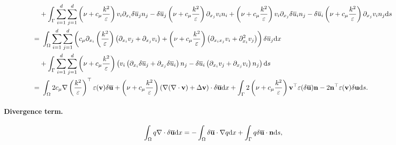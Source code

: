 \documentclass[oneside,11pt]{book}
\numberwithin{equation}{section}
\begin{document}
\begin{align*}
    &+ \int_\Gamma \sum_{i=1}^d\sum_{j=1}^d \left(\nu + c_\mu\frac{k^2}{\varepsilon}\right)v_i\partial_{x_i}\delta\overline{u}_jn_j - \delta\overline{u}_j\left(\nu + c_\mu\frac{k^2}{\varepsilon}\right)\partial_{x_j}v_in_i + \left(\nu + c_\mu\frac{k^2}{\varepsilon}\right)v_i\partial_{x_j}\delta\overline{u}_in_j - \delta\overline{u}_i\left(\nu + c_\mu\frac{k^2}{\varepsilon}\right)\partial_{x_j}v_in_j{\rm d}s\\
    =&\ \int_\Omega \sum_{i=1}^d\sum_{j=1}^d \left(c_\mu\partial_{x_i}\left(\frac{k^2}{\varepsilon}\right)\left(\partial_{x_i}v_j + \partial_{x_j}v_i\right) + \left(\nu + c_\mu\frac{k^2}{\varepsilon}\right)\left(\partial_{x_ix_j}v_i + \partial_{x_i}^2v_j\right)\right)\delta\overline{u}_j{\rm d}x\\
    &+ \int_\Gamma \sum_{i=1}^d\sum_{j=1}^d \left(\nu + c_\mu\frac{k^2}{\varepsilon}\right)\left(v_i\left(\partial_{x_i}\delta\overline{u}_j + \partial_{x_j}\delta\overline{u}_i\right)n_j - \delta\overline{u}_i\left(\partial_{x_i}v_j + \partial_{x_j}v_i\right)n_j\right){\rm d}s\\
    =&\ \int_\Omega 2c_\mu\nabla\left(\frac{k^2}{\varepsilon}\right)^\top\varepsilon({\bf v})\delta\overline{\bf u} + \left(\nu + c_\mu\frac{k^2}{\varepsilon}\right)\left(\nabla(\nabla\cdot{\bf v}) + \Delta{\bf v}\right)\cdot\delta\overline{\bf u}{\rm d}x + \int_\Gamma 2\left(\nu + c_\mu\frac{k^2}{\varepsilon}\right){\bf v}^\top\varepsilon(\delta\overline{\bf u}){\bf n} - 2{\bf n}^\top\varepsilon({\bf v})\delta{\bf u}{\rm d}s.
\end{align*}
\paragraph*{Divergence term.} 
\begin{align*}
    \int_\Omega q\nabla\cdot\delta\overline{\bf u}{\rm d}x = -\int_\Omega \delta\overline{\bf u}\cdot\nabla q{\rm d}x + \int_\Gamma q\delta\overline{\bf u}\cdot{\bf n}{\rm d}s,
\end{align*}
\end{document}
